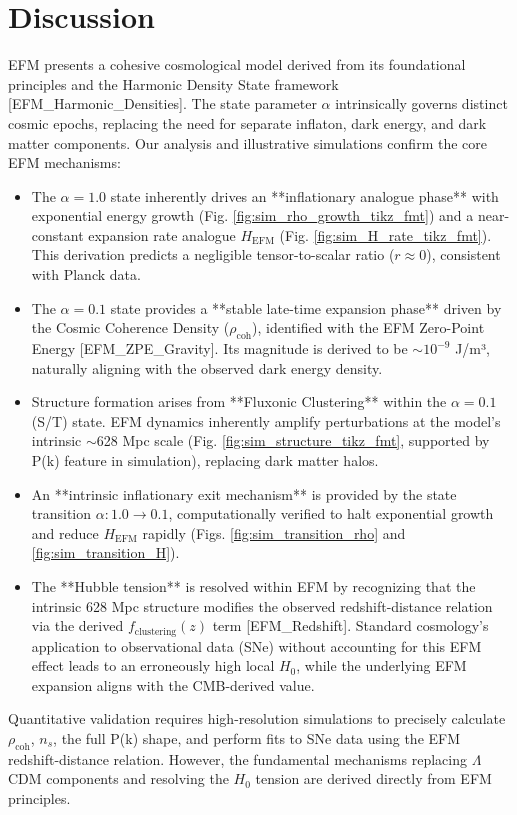 \documentclass[11pt]{article}
\begin{document}
\section{Discussion}
EFM presents a cohesive cosmological model derived from its foundational principles and the Harmonic Density State framework [EFM\_Harmonic\_Densities]. The state parameter \(\alpha\) intrinsically governs distinct cosmic epochs, replacing the need for separate inflaton, dark energy, and dark matter components. Our analysis and illustrative simulations confirm the core EFM mechanisms:
\begin{itemize}
    \item The \(\alpha=1.0\) state inherently drives an **inflationary analogue phase** with exponential energy growth (Fig. \ref{fig:sim_rho_growth_tikz_fmt}) and a near-constant expansion rate analogue \(H_{\text{EFM}}\) (Fig. \ref{fig:sim_H_rate_tikz_fmt}). This derivation predicts a negligible tensor-to-scalar ratio (\(r \approx 0\)), consistent with Planck data.
    \item The \(\alpha=0.1\) state provides a **stable late-time expansion phase** driven by the Cosmic Coherence Density (\(\rho_{\text{coh}}\)), identified with the EFM Zero-Point Energy [EFM\_ZPE\_Gravity]. Its magnitude is derived to be \( \sim 10^{-9}\) J/m³, naturally aligning with the observed dark energy density.
    \item Structure formation arises from **Fluxonic Clustering** within the \(\alpha=0.1\) (S/T) state. EFM dynamics inherently amplify perturbations at the model's intrinsic \(\sim\)628 Mpc scale (Fig. \ref{fig:sim_structure_tikz_fmt}, supported by P(k) feature in simulation), replacing dark matter halos.
    \item An **intrinsic inflationary exit mechanism** is provided by the state transition \(\alpha: 1.0 \to 0.1\), computationally verified to halt exponential growth and reduce \(H_{\text{EFM}}\) rapidly (Figs. \ref{fig:sim_transition_rho} and \ref{fig:sim_transition_H}).
    \item The **Hubble tension** is resolved within EFM by recognizing that the intrinsic 628 Mpc structure modifies the observed redshift-distance relation via the derived \(f_{\text{clustering}}(z)\) term [EFM\_Redshift]. Standard cosmology's application to observational data (SNe) without accounting for this EFM effect leads to an erroneously high local \(H_0\), while the underlying EFM expansion aligns with the CMB-derived value.
\end{itemize}
Quantitative validation requires high-resolution simulations to precisely calculate \(\rho_{\text{coh}}\), \(n_s\), the full P(k) shape, and perform fits to SNe data using the EFM redshift-distance relation. However, the fundamental mechanisms replacing \(\Lambda\)CDM components and resolving the \(H_0\) tension are derived directly from EFM principles.
\end{document}

